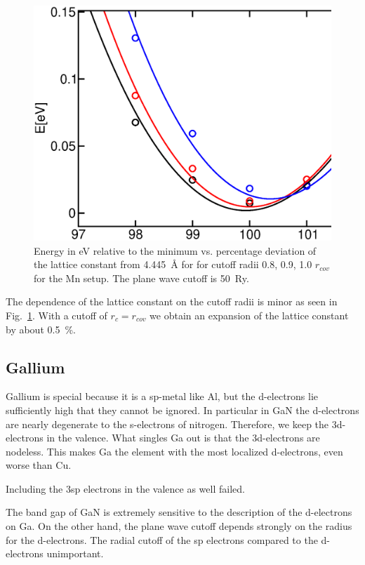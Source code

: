 \documentclass[11pt,a4paper]{report}
\begin{document}
\begin{figure}[!h]
\begin{center}
\includegraphics[width=0.5\linewidth,clip=true]{Figs/Mn_setuptest/mnoevsalat50ry.eps}
\end{center}
\caption{\label{fig:mno_evsalat50ry}Energy in eV relative to the
  minimum vs. percentage deviation of the lattice constant from
  4.445~{\AA} for for cutoff radii 0.8, 0.9, 1.0 $r_{cov}$ for the Mn
  setup. The plane wave cutoff is 50~Ry.}
\end{figure}
The dependence of the lattice constant on the cutoff radii is minor as
seen in Fig.~\ref{fig:mno_evsalat50ry}. With a cutoff of $r_c=r_{cov}$
we obtain an expansion of the lattice constant by about 0.5~\%.



\subsection{Gallium}
Gallium is special because it is a sp-metal like Al, but the
d-electrons lie sufficiently high that they cannot be ignored. In
particular in GaN the d-electrons are nearly degenerate to the
s-electrons of nitrogen.  Therefore, we keep the 3d-electrons in the
valence.  What singles Ga out is that the 3d-electrons are
nodeless. This makes Ga the element with the most localized
d-electrons, even worse than Cu.

Including the 3sp
electrons in the valence as well failed. 


The band gap of GaN is extremely sensitive to the description of the
d-electrons on Ga. On the other hand, the plane wave cutoff depends
strongly on the radius for the d-electrons.
The radial cutoff of the sp electrons compared to the d-electrons
unimportant.
\end{document}
